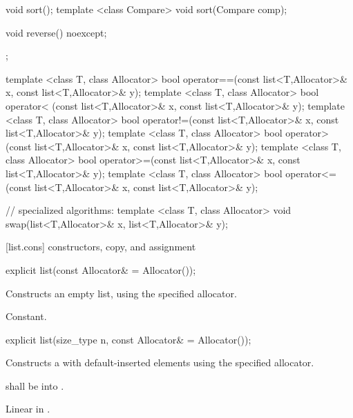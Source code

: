 \begin{codeblock}
{{    void sort();
    template <class Compare> void sort(Compare comp);

    void reverse() noexcept;
  };

  template <class T, class Allocator>
    bool operator==(const list<T,Allocator>& x, const list<T,Allocator>& y);
  template <class T, class Allocator>
    bool operator< (const list<T,Allocator>& x, const list<T,Allocator>& y);
  template <class T, class Allocator>
    bool operator!=(const list<T,Allocator>& x, const list<T,Allocator>& y);
  template <class T, class Allocator>
    bool operator> (const list<T,Allocator>& x, const list<T,Allocator>& y);
  template <class T, class Allocator>
    bool operator>=(const list<T,Allocator>& x, const list<T,Allocator>& y);
  template <class T, class Allocator>
    bool operator<=(const list<T,Allocator>& x, const list<T,Allocator>& y);

  // specialized algorithms:
  template <class T, class Allocator>
    void swap(list<T,Allocator>& x, list<T,Allocator>& y);
}
\end{codeblock}

[list.cons]{ constructors, copy, and assignment}

%
%
\begin{itemdecl}
explicit list(const Allocator& = Allocator());
\end{itemdecl}

\begin{itemdescr}
\pnum
\effects
Constructs an empty list, using the specified allocator.

\pnum
\complexity
Constant.
\end{itemdescr}

%
%
\begin{itemdecl}
explicit list(size_type n, const Allocator& = Allocator());
\end{itemdecl}

\begin{itemdescr}
\pnum
\effects Constructs a  with
 default-inserted elements using the specified allocator.

\pnum
\requires {} shall be  into .

\pnum
\complexity
Linear in
.
\end{itemdescr}

